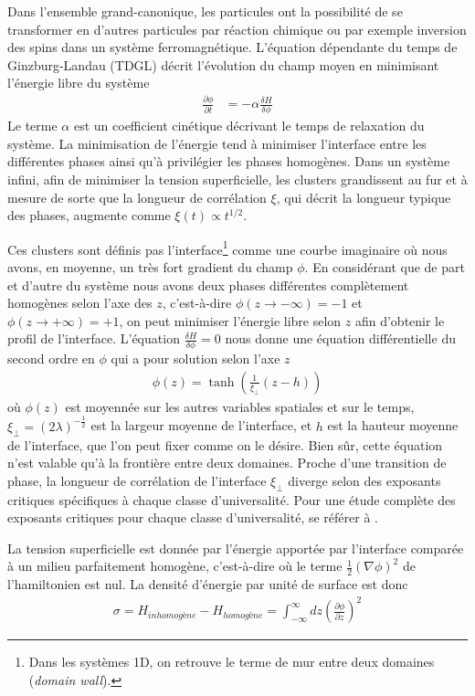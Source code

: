 Dans l'ensemble grand-canonique, les particules ont la possibilité de se transformer en d'autres particules par réaction chimique ou par exemple inversion des spins dans un système ferromagnétique. L'équation dépendante du temps de Ginzburg-Landau (TDGL) décrit l'évolution du champ moyen en minimisant l'énergie libre du système
\begin{align}
    \frac{\partial \phi}{\partial t} &= - \alpha \frac{\delta H}{\delta \phi} 
    \label{tdgl}
\end{align}
Le terme $\alpha$ est un coefficient cinétique décrivant le temps de relaxation du système. La minimisation de l'énergie tend à minimiser l'interface entre les différentes phases ainsi qu'à privilégier les phases homogènes. Dans un système infini, afin de minimiser la tension superficielle, les clusters grandissent au fur et à mesure de sorte que la longueur de corrélation $\xi$, qui décrit la longueur typique des phases, augmente comme $\xi(t) \propto t^{1/2}$.

Ces clusters sont définis pas l'interface\footnote{Dans les systèmes 1D, on retrouve le terme de mur entre deux domaines (\textit{domain wall}).} comme une courbe imaginaire où nous avons, en moyenne, un très fort gradient du champ $\phi$. 
En considérant que de part et d'autre du système nous avons deux phases différentes complètement homogènes selon l'axe des $z$, c'est-à-dire $\phi(z \to -\infty) = -1$ et $\phi(z \to +\infty) = +1$, on peut minimiser l'énergie libre selon $z$ afin d'obtenir le profil de l'interface. L'équation $\frac{\delta H}{\delta \phi} = 0$ nous donne une équation différentielle du second ordre en $\phi$ qui a pour solution selon l'axe $z$
\begin{align}
    \phi(z) = \tanh(\frac{1}{\xi_\perp} (z-h))
    \label{profil-phi}
\end{align}
où $\phi(z)$ est moyennée sur les autres variables spatiales et sur le temps, $\xi_\perp = (2\lambda)^{-\frac{1}{2}}$ est la largeur moyenne de l'interface, et $h$ est la hauteur moyenne de l'interface, que l'on peut fixer comme on le désire. Bien sûr, cette équation n'est valable qu'à la frontière entre deux domaines. Proche d'une transition de phase, la longueur de corrélation de l'interface $\xi_\perp$  diverge selon des exposants critiques spécifiques à chaque classe d'universalité. Pour une étude complète des exposants critiques pour chaque classe d'universalité, se référer à \cite{pelissetto_critical_2002}. 

La tension superficielle est donnée par l'énergie apportée par l'interface comparée à un milieu parfaitement homogène, c'est-à-dire où le terme $\frac{1}{2}(\nabla \phi)^2$ de l'hamiltonien est nul. La densité d'énergie par unité de surface est donc
\begin{align}
    \sigma = H_{inhomogène} - H_{homogène} = \int_{-\infty}^\infty dz \left(\frac{\partial \phi}{\partial z} \right)^2
\end{align}


